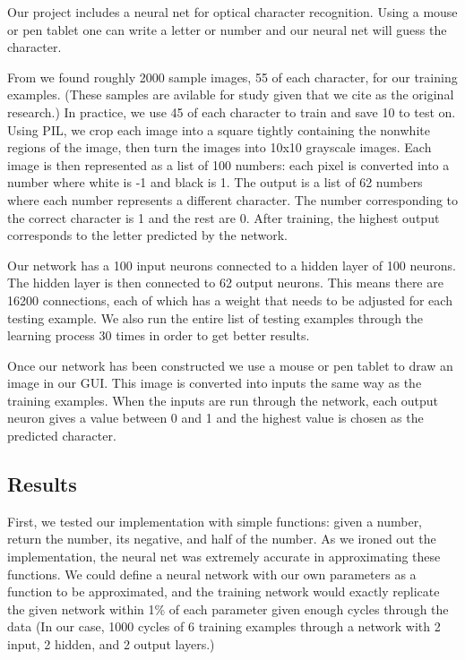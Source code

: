 \documentclass[11pt,a4paper]{article}
\begin{document}
Our project includes a neural net for optical character recognition. Using a mouse or pen tablet one can write a letter or number and our neural net will guess the character.

From  we found roughly 2000 sample images, 55 of each character, for our training examples. (These samples are avilable for study given that we cite  as the original research.) In practice, we use 45 of each character to train and save 10 to test on. Using PIL, we crop each image into a square tightly containing the nonwhite regions of the image, then turn the images into 10x10 grayscale images. Each image is then represented as a list of 100 numbers: each pixel is converted into a number where white is -1 and black is 1. The output is a list of 62 numbers where each number represents a different character. The number corresponding to the correct character is 1 and the rest are 0. After training, the highest output corresponds to the letter predicted by the network.

Our network has a 100 input neurons connected to a hidden layer of 100 neurons. The hidden layer is then connected to 62 output neurons. This means there are 16200 connections, each of which has a weight that needs to be adjusted for each testing example. We also run the entire list of testing examples through the learning process 30 times in order to get better results.	

Once our network has been constructed we use a mouse or pen tablet to draw an image in our GUI. This image is converted into inputs the same way as the training examples. When the inputs are run through the network, each output neuron gives a value between 0 and 1 and the highest value is chosen as the predicted character.

\subsection{Results}
\label{Artificial Neural Nets:Results}

First, we tested our implementation with simple functions: given a number, return the number, its negative, and half of the number. As we ironed out the implementation, the neural net was extremely accurate in approximating these functions. We could define a neural network with our own parameters as a function to be approximated, and the training network would exactly replicate the given network within 1\% of each parameter given enough cycles through the data (In our case, 1000 cycles of 6 training examples through a network with 2 input, 2 hidden, and 2 output layers.)
\end{document}
